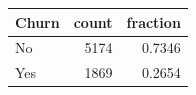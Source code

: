 \begin{tabular}{lrr}
\toprule
Churn & count & fraction \\
\midrule
No & 5174 & 0.7346 \\
Yes & 1869 & 0.2654 \\
\bottomrule
\end{tabular}
